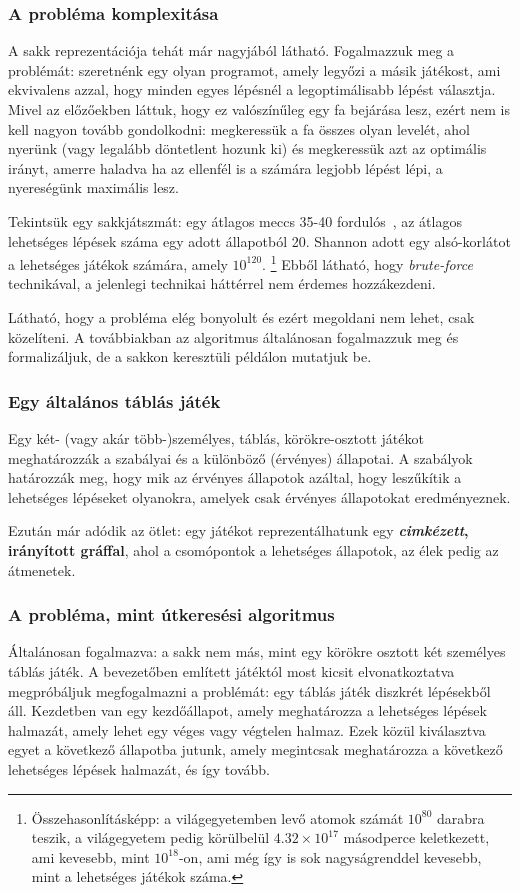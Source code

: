 \documentclass[twoside, a4paper, 12pt]{article}
\begin{document}
\subsubsection{A probléma komplexitása}
A sakk reprezentációja tehát már nagyjából látható. Fogalmazzuk meg a problémát: szeretnénk egy olyan programot, amely legyőzi a másik játékost, ami ekvivalens azzal, hogy minden egyes lépésnél a legoptimálisabb lépést választja. Mivel az előzőekben láttuk, hogy ez valószínűleg egy fa bejárása lesz, ezért nem is kell nagyon tovább gondolkodni: megkeressük a fa összes olyan levelét, ahol nyerünk (vagy legalább döntetlent hozunk ki) és megkeressük azt az optimális irányt, amerre haladva ha az ellenfél is a számára legjobb lépést lépi, a nyereségünk maximális lesz.

Tekintsük egy sakkjátszmát: egy átlagos meccs 35-40 fordulós~\cite{averageLengthOfChessGame}\cite{averageLengthOfChessGame2}\cite{chessStatistics}, az átlagos lehetséges lépések száma egy adott állapotból 20\cite{shannonnumber}. Shannon adott egy alsó-korlátot a lehetséges játékok számára, amely $10^{120}$. \footnote{Összehasonlításképp: a világegyetemben levő atomok számát $10^{80}$ darabra teszik, a világegyetem pedig körülbelül $4.32 \times 10^{17}$ másodperce keletkezett, ami kevesebb, mint $10^{18}$-on, ami még így is sok nagyságrenddel kevesebb, mint a lehetséges játékok száma.} Ebből látható, hogy \textit{brute-force} technikával, a jelenlegi technikai háttérrel nem érdemes hozzákezdeni.

Látható, hogy a probléma elég bonyolult és ezért megoldani nem lehet, csak közelíteni. A továbbiakban az algoritmus általánosan fogalmazzuk meg és formalizáljuk, de a sakkon keresztüli példálon mutatjuk be.

\subsubsection{Egy általános táblás játék}
Egy két- (vagy akár több-)személyes, táblás, körökre-osztott játékot meghatározzák a szabályai és a különböző (érvényes) állapotai. A szabályok határozzák meg, hogy mik az érvényes állapotok azáltal, hogy leszűkítik a lehetséges lépéseket olyanokra, amelyek csak érvényes állapotokat eredményeznek.

Ezután már adódik az ötlet: egy játékot reprezentálhatunk egy \textbf{\textit{cimkézett}, irányított gráffal}, ahol a csomópontok a lehetséges állapotok, az élek pedig az átmenetek.

\subsubsection{A probléma, mint útkeresési algoritmus}
Általánosan fogalmazva: a sakk nem más, mint egy körökre osztott két személyes táblás játék. A bevezetőben említett játéktól most kicsit elvonatkoztatva megpróbáljuk megfogalmazni a problémát: egy táblás játék diszkrét lépésekből áll. Kezdetben van egy kezdőállapot, amely meghatározza a lehetséges lépések halmazát, amely lehet egy véges vagy végtelen halmaz. Ezek közül kiválasztva egyet a következő állapotba jutunk, amely megintcsak meghatározza a következő lehetséges lépések halmazát, és így tovább. 
\end{document}
